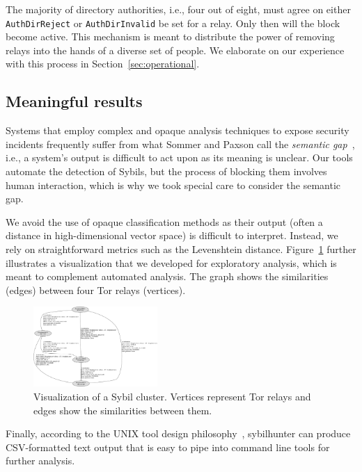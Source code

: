 The majority of directory authorities, i.e., four out of eight, must agree on
either \texttt{AuthDirReject} or \texttt{AuthDirInvalid} be set for a relay.
Only then will the block become active.  This mechanism is meant to distribute
the power of removing relays into the hands of a diverse set of people.  We
elaborate on our experience with this process in Section~\ref{sec:operational}.

\subsection{Meaningful results}
Systems that employ complex and opaque analysis techniques to expose security
incidents frequently suffer from what Sommer and Paxson call the \emph{semantic
gap}~\cite[\S III.C]{Sommer2010a}, i.e., a system's output is difficult to act
upon as its meaning is unclear.  Our tools automate the detection of Sybils,
but the process of blocking them involves human interaction, which is why we
took special care to consider the semantic gap.

We avoid the use of opaque classification methods as their output (often a
distance in high-dimensional vector space) is difficult to interpret.  Instead,
we rely on straightforward metrics such as the Levenshtein distance.
Figure~\ref{fig:visualization} further illustrates a visualization that we
developed for exploratory analysis, which is meant to complement automated
analysis.  The graph shows the similarities (edges) between four Tor relays
(vertices).

\begin{figure}[t]
	\centering
	\includegraphics[width=0.42\textwidth]{diagrams/visualization.pdf}
    \caption{Visualization of a Sybil cluster.  Vertices represent Tor relays
    and edges show the similarities between them.}
	\label{fig:visualization}
\end{figure}

Finally, according to the UNIX tool design philosophy~\cite{Pike1983a},
sybilhunter can produce CSV-formatted text output that is easy to pipe into
command line tools for further analysis.
